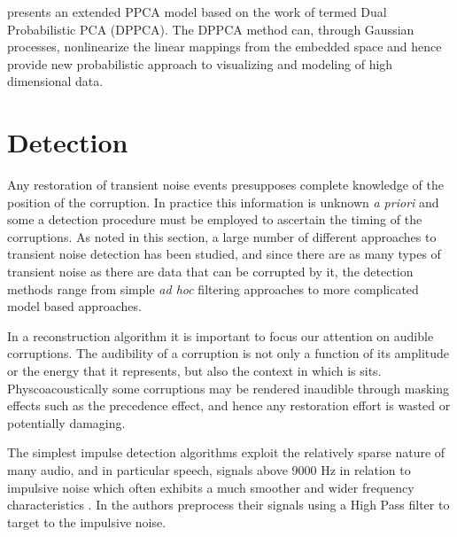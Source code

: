 \cite{Lawrence2005} presents an extended PPCA model based on the work of \cite{Tipping1999} termed Dual Probabilistic PCA (DPPCA). The DPPCA method can, through Gaussian processes, nonlinearize the linear mappings from the embedded space and hence provide new probabilistic approach to visualizing and modeling of high dimensional data.
\section{Detection}\label{sec:LitRev_Detection}

Any restoration of transient noise events presupposes complete knowledge of the position of the corruption. In practice this information is unknown \emph{a priori} and some a detection procedure must be employed to ascertain the timing of the corruptions. As noted in this section, a large number of different approaches to transient noise detection has been studied, and since there are as many types of transient noise as there are data that can be corrupted by it, the  detection methods range from simple \emph{ad hoc} filtering approaches to more complicated model based approaches.

In a reconstruction algorithm it is important to focus our attention on audible corruptions. The audibility of a corruption is not only a function of its amplitude or the energy that it represents, but also the context in which is sits. Physcoacoustically some corruptions may be rendered inaudible through masking effects such as the precedence effect, and hence any restoration effort is wasted or potentially damaging.

The simplest impulse detection algorithms exploit the relatively sparse nature of many audio, and in particular speech, signals above 9000 Hz in relation to impulsive noise which often exhibits a much smoother and wider frequency characteristics \cite{Subramanya2007}. In \cite{Kasparis1993}\cite{US6795559} the authors preprocess their signals using a High Pass filter to target to the impulsive noise.

